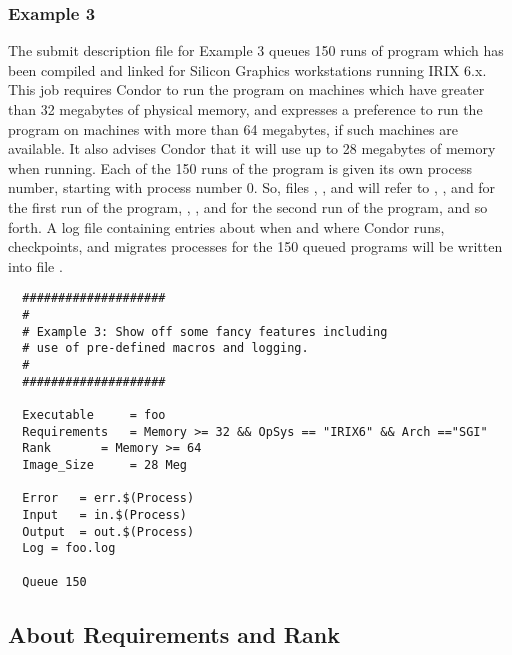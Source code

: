 \subsubsection{Example 3}

The submit description file for Example 3 queues 150
runs of program  which has been compiled and linked for
Silicon Graphics workstations running IRIX 6.x. 
This job requires Condor to run the program on machines which have
greater than 32 megabytes of physical memory, and expresses a
preference to run the program on machines with more than 64 megabytes,
if such machines are available.  It also advises Condor that it will
use up to 28 megabytes of memory when running.
Each of the 150 runs of the program is given its own process number,
starting with process number 0.
So, files 
, , and  will
refer to , , and  for the first run
of the program,
, ,
and  for the second run of the program, and so forth.
A log file containing entries
about when and where Condor runs, checkpoints, and migrates processes for
the 150 queued programs
will be written into file .
\begin{verbatim}
  ####################                    
  #
  # Example 3: Show off some fancy features including
  # use of pre-defined macros and logging.
  #
  ####################                                                    

  Executable     = foo                                                    
  Requirements   = Memory >= 32 && OpSys == "IRIX6" && Arch =="SGI"     
  Rank		 = Memory >= 64
  Image_Size     = 28 Meg                                                 

  Error   = err.$(Process)                                                
  Input   = in.$(Process)                                                 
  Output  = out.$(Process)                                                
  Log = foo.log

  Queue 150
\end{verbatim}


\subsection{About Requirements and Rank}

